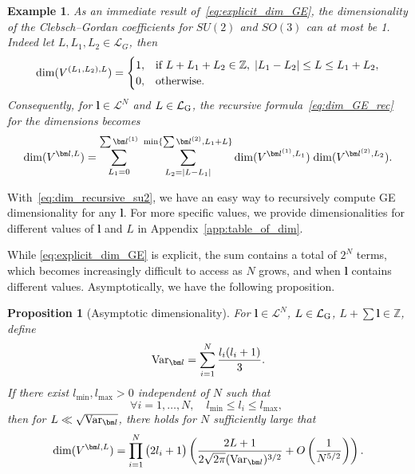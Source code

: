 \documentclass{article}
\newcommand{\dimge}[2]{\dim(V^{#1,#2})}
\newtheorem{proposition}[theorem]{Proposition}
\newtheorem{example}[theorem]{Example}
\numberwithin{equation}{section}
\def\Z{\mathbb{Z}}
\def\bl{{\bm l}}
\def\calL{\mathcal{L}}
\def\calLG{\mathcal{\calL_{\rm G}}}
\def\Nat{{N}}
\def\dim{{{\rm dim}}}
\begin{document}
\begin{example}\label{exam:dim_cg_su2}
As an immediate result of~\eqref{eq:explicit_dim_GE}, the dimensionality of the Clebsch--Gordan coefficients for $SU(2)$ and $SO(3)$ can at most be 1.
Indeed let $L,L_1,L_2\in\calL_G$, then 
\begin{equation*}
        \dimge{(L_1,L_2)}{L}= \begin{cases}
        1, & \textup{if } L+L_1+L_2\in\Z, \; |L_1-L_2|\le L\le L_1+L_2,\\
        0, & \textup{otherwise}.
    \end{cases}
\end{equation*}
Consequently, for $\bl\in\calL^N$ and $L\in\calLG$, the recursive formula~\eqref{eq:dim_GE_rec} for the dimensions becomes
\begin{equation}\label{eq:dim_recursive_su2}
    \dimge{\bl}{L} = \sum_{L_1=0}^{\sum\bl^{(1)}}\;\sum_{L_2=|L-L_1|}^{\min\{\sum\bl^{(2)},L_1+L\}}\dimge{\bl^{(1)}}{L_1} \; \dimge{\bl^{(2)}}{L_2}.
\end{equation}
\end{example}

With~\eqref{eq:dim_recursive_su2}, we have an easy way to recursively compute GE dimensionality for any $\bl$. 
For more specific values, we provide dimensionalities for different values of $\bl$ and $L$ in 
Appendix~\ref{app:table_of_dim}.

\medskip

While \eqref{eq:explicit_dim_GE} is explicit, the sum contains a total of $2^N$ terms, which becomes increasingly difficult to access as $N$ grows, and when $\bl$ contains different values. 
Asymptotically, we have the following proposition.



\begin{proposition}[Asymptotic dimensionality]\label{prop:asym-dim-ge}
    For $\bl\in\calL^N$, $L\in\calLG$, $L+\sum\bl\in\Z$, define
    \[
        \textup{Var}_\bl = \sum_{i=1}^N \frac{l_i(l_i+1)}{3}.
    \]
    If there exist $l_{\min},l_{\max}> 0$ independent of $\Nat$ such that
    \begin{equation}\label{eq:bounded-ll}
    \forall i=1,\ldots,\Nat, \quad l_{\min} \le l_i\le l_{\max},\;
    \end{equation}
    then for $L\ll\sqrt{\textup{Var}_\bl}$, there holds for $\Nat$ sufficiently large that
    \begin{equation}
        \label{eq:dimge-est}
        \dimge{\bl}{L} = \prod_{i=1}^N\big(2l_i+1\big)
        \left(\frac{2L+1}{2\sqrt{2\pi}(\textup{Var}_\bl)^{3/2}}+O\left(\frac{1}{\Nat^{5/2}}\right)\right).
    \end{equation}
\end{proposition}
\end{document}
